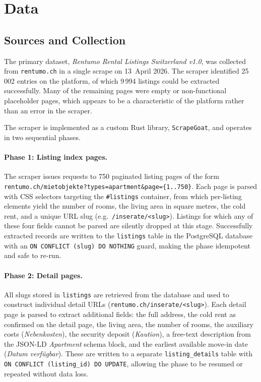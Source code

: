 \documentclass[11pt,a4paper]{article}
\begin{document}
\section{Data}
\label{sec:data}

\subsection{Sources and Collection}
The primary dataset, \emph{Rentumo Rental Listings Switzerland v1.0}, was collected from \texttt{rentumo.ch} in a single scrape on 13~April 2026. The scraper identified 25\,002 entries on the platform, of which 9\,994 listings could be extracted successfully. Many of the remaining pages were empty or non-functional placeholder pages, which appears to be a characteristic of the platform rather than an error in the scraper.

The scraper is implemented as a custom Rust library, \texttt{ScrapeGoat}, and operates in two sequential phases.

\paragraph{Phase 1: Listing index pages.}
The scraper issues requests to 750 paginated listing pages of the form \texttt{rentumo.ch/mietobjekte?types=apartment\&page=\{1..750\}}. Each page is parsed with CSS selectors targeting the \texttt{\#listings} container, from which per-listing elements yield the number of rooms, the living area in square metres, the cold rent, and a unique URL slug (e.g.\ \texttt{/inserate/<slug>}). Listings for which any of these four fields cannot be parsed are silently dropped at this stage. Successfully extracted records are written to the \texttt{listings} table in the PostgreSQL database with an \texttt{ON CONFLICT (slug) DO NOTHING} guard, making the phase idempotent and safe to re-run.

\paragraph{Phase 2: Detail pages.}
All slugs stored in \texttt{listings} are retrieved from the database and used to construct individual detail URLs (\texttt{rentumo.ch/inserate/<slug>}). Each detail page is parsed to extract additional fields: the full address, the cold rent as confirmed on the detail page, the living area, the number of rooms, the auxiliary costs (\emph{Nebenkosten}), the security deposit (\emph{Kaution}), a free-text description from the JSON-LD \emph{Apartment} schema block, and the earliest available move-in date (\emph{Datum verfügbar}). These are written to a separate \texttt{listing\_details} table with \texttt{ON CONFLICT (listing\_id) DO UPDATE}, allowing the phase to be resumed or repeated without data loss.
\end{document}
